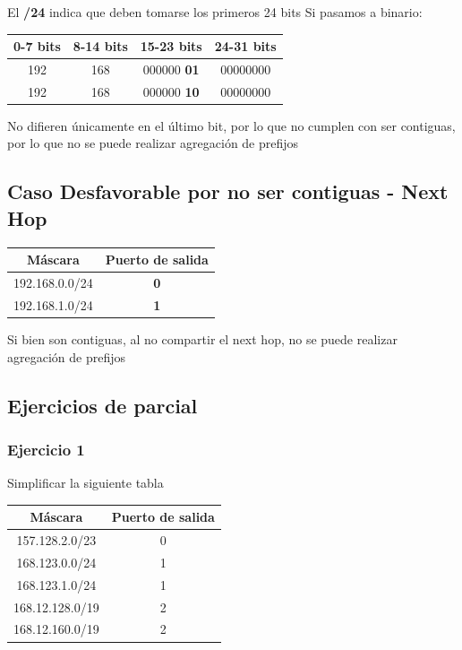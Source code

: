 \documentclass[titlepage,a4paper]{article}
\begin{document}
El \textbf{/24} indica que deben tomarse los primeros 24 bits
Si pasamos a binario:

\begin{center}
    \begin{tabular}{c|c|c|c}
        0-7 bits & 8-14 bits & 15-23 bits & 24-31 bits \\
        \hline
        \hline
        192 & 168 & 000000 \textbf{01} & 00000000 \\
        \hline
        192 & 168 & 000000 \textbf{10} & 00000000 \\
    \end{tabular}
\end{center}

No difieren únicamente en el último bit, por lo que no cumplen con ser contiguas, por lo que no se puede realizar agregación de prefijos


\subsection{Caso Desfavorable por no ser contiguas - Next Hop}

\begin{center}
    \begin{tabular}{c|c}
        Máscara & Puerto de salida \\
        \hline
        \hline
         192.168.0.0/24 &  \textbf{0}\\
         \hline
         192.168.1.0/24 &  \textbf{1}
    \end{tabular}
\end{center}

Si bien son contiguas, al no compartir el next hop, no se puede realizar agregación de prefijos


\subsection{Ejercicios de parcial}

\subsubsection{Ejercicio 1}
Simplificar la siguiente tabla

\begin{center}
    \begin{tabular}{c|c}
        Máscara & Puerto de salida \\
        \hline
        \hline
        157.128.2.0/23 &  0\\
        \hline
        168.123.0.0/24 &  1 \\
        \hline
        168.123.1.0/24 &  1 \\
        \hline
        168.12.128.0/19 &  2 \\
        \hline
        168.12.160.0/19 &  2 \\
    \end{tabular}
\end{center}
\end{document}
